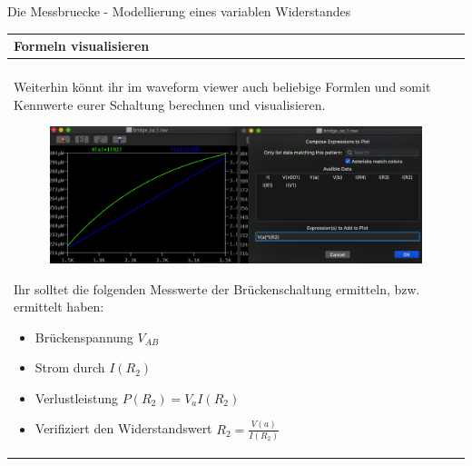 \begin{frame}[t]{Die Messbruecke - Modellierung eines variablen Widerstandes} 
    
    \begin{spacing}{0.9} \begin{tiny}
      \begin{table}[h!]
      \begin{tabular}{p{10cm}}
        \hline
        \textbf{Formeln visualisieren} \\
        \hline \\
        \begin{minipage}{\textwidth}
          Weiterhin könnt ihr im waveform viewer auch beliebige Formlen und somit Kennwerte
          eurer Schaltung berechnen und visualisieren.
            \begin{figure}
                \centering
                \includegraphics[width=0.95\linewidth]{pictures/waveform_formulas.png}
            \end{figure}
            Ihr solltet die folgenden Messwerte der Brückenschaltung ermitteln, bzw. ermittelt haben:
            \begin{itemize}
              \item Brückenspannung $V_{AB}$
              \item Strom durch $I(R_2)$
              \item Verlustleistung $P(R_2)=V_aI(R_2)$
              \item Verifiziert den Widerstandswert $R_2=\frac{V(a)}{I(R_2)}$
            \end{itemize}
        \end{minipage} 
        \\
      \end{tabular}

    \end{table}
     
    \end{tiny} \end{spacing}

\end{frame}
